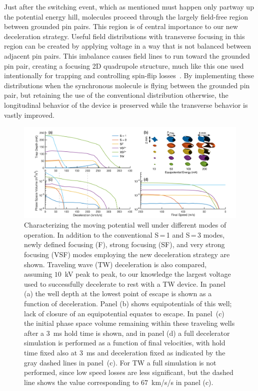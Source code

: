 \documentclass[%
 reprint,
 amsmath,amssymb,
 aps,
prl,
]{revtex4-1}
\begin{document}
Just after the switching event, which as mentioned must happen only partway up the potential energy hill, molecules proceed through the largely field-free region between grounded pin pairs.
This region is of central importance to our new deceleration strategy.
Useful field distributions with transverse focusing in this region can be created by applying voltage in a way that is not balanced between adjacent pin pairs. 
This imbalance causes field lines to run toward the grounded pin pair, creating a focusing 2D quadrupole structure, much like this one used intentionally for trapping and controlling spin-flip losses~\cite{Reens2017}. 
By implementing these distributions when the synchronous molecule is flying between the grounded pin pair, but retaining the use of the conventional distribution otherwise, the longitudinal behavior of the device is preserved while the transverse behavior is vastly improved.
\begin{figure}[ht!]
\includegraphics[trim=45 7 40 10, clip, width=\linewidth]{full-four-panel.png}%
\vspace{-5pt}
\caption{
Characterizing the moving potential well under different modes of operation. In addition to the conventional S\,=\,1 and S\,=\,3 modes, newly defined focusing (F), strong focusing (SF), and very strong focusing (VSF) modes employing the new deceleration strategy are shown. Traveling wave (TW) deceleration is also compared, assuming $10$~kV peak to peak, to our knowledge the largest voltage used to successfully decelerate to rest with a TW device. In panel (a) the well depth at the lowest point of escape is shown as a function of deceleration. Panel (b) shows equipotentials of this well; lack of closure of an equipotential equates to escape. In panel~(c) the initial phase space volume remaining within these traveling wells after a $3$~ms hold time is shown, and in panel (d) a full decelerator simulation is performed as a function of final velocities, with hold time fixed also at $3$~ms and deceleration fixed as indicated by the gray dashed lines in panel~(c). For TW a full simulation is not performed, since low speed losses are less significant, but the dashed line shows the value corresponding to $67$~km/s/s in panel (c).\vspace{-4mm}}
\label{fig:efftrap}
\end{figure}
\end{document}
